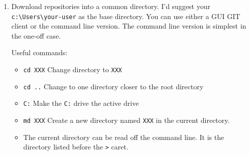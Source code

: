 \documentclass{article}
\begin{document}
\begin{enumerate}
\begin{enumerate}
\begin{enumerate}
            \item IzPack is only available as a \verb|.jar| file.  Usually, you can double click a \verb|.jar| file to install it.  Sometimes it is necessary to use the command line, change to the directory containing the jar file and use the \verb|java -jar izpack??.jar| as instructed on the download page.
            \item \emph{Do not accept the default installation directory}.  Instead install IzPack into \verb|c:\IZPack|.\end{enumerate}
        \item Install Gnu SED [\url{https://gnuwin32.sourceforge.net/packages/sed.htm}]
        \item Install Launch4J [\url{https://sourceforge.net/projects/launch4j/files/launch4j-3/}]  Launch4J is a Java executable creator for Windows.
        \begin{enumerate}
            \item Download the installer \verb|.exe| file and run it.  Accept the default installation options.
        \end{enumerate}
    \end{enumerate}
    \item Download repositories into a common directory. I'd suggest your \verb|c:\Users\your-user| as the base directory.  You can use either a GUI GIT client or the command line version.  The command line version is simplest in the one-off case.

    Useful commands:
    \begin{itemize}
        \item \verb|cd XXX| Change directory to \verb|XXX|
        \item \verb|cd ..| Change to one directory closer to the root directory
        \item \verb|C:|  Make the \verb|C:| drive the active drive
        \item \verb|md XXX| Create a new directory named \verb|XXX| in the current directory.
        \item The current directory can be read off the command line.  It is the directory listed before the \verb|>| caret.
    \end{itemize}
    

\end{enumerate}
\end{document}
